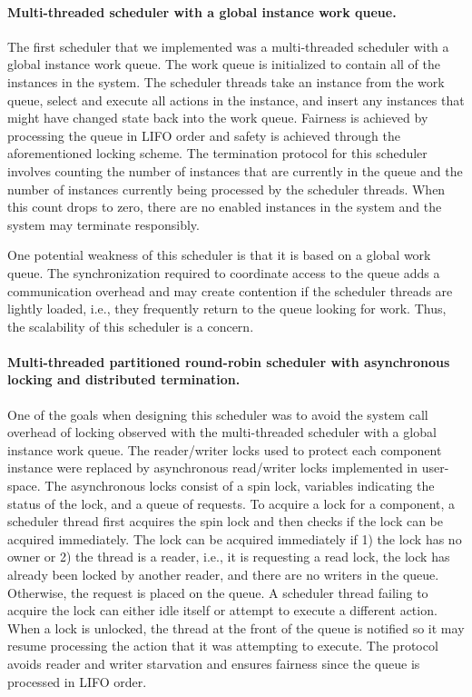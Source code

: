 \paragraph{Multi-threaded scheduler with a global instance work queue.}
The first scheduler that we implemented was a multi-threaded scheduler with a global instance work queue.
The work queue is initialized to contain all of the instances in the system.
The scheduler threads take an instance from the work queue, select and execute all actions in the instance, and insert any instances that might have changed state back into the work queue.
Fairness is achieved by processing the queue in LIFO order and safety is achieved through the aforementioned locking scheme.
The termination protocol for this scheduler involves counting the number of instances that are currently in the queue and the number of instances currently being processed by the scheduler threads.
When this count drops to zero, there are no enabled instances in the system and the system may terminate responsibly.

One potential weakness of this scheduler is that it is based on a global work queue.
The synchronization required to coordinate access to the queue adds a communication overhead and may create contention if the scheduler threads are lightly loaded, i.e., they frequently return to the queue looking for work.
Thus, the scalability of this scheduler is a concern.

\paragraph{Multi-threaded partitioned round-robin scheduler with asynchronous locking and distributed termination.}
One of the goals when designing this scheduler was to avoid the system call overhead of locking observed with the multi-threaded scheduler with a global instance work queue.
The reader/writer locks used to protect each component instance were replaced by asynchronous read/writer locks implemented in user-space.
The asynchronous locks consist of a spin lock, variables indicating the status of the lock, and a queue of requests.
To acquire a lock for a component, a scheduler thread first acquires the spin lock and then checks if the lock can be acquired immediately.
The lock can be acquired immediately if 1) the lock has no owner or 2) the thread is a reader, i.e., it is requesting a read lock, the lock has already been locked by another reader, and there are no writers in the queue.
Otherwise, the request is placed on the queue.
A scheduler thread failing to acquire the lock can either idle itself or attempt to execute a different action.
When a lock is unlocked, the thread at the front of the queue is notified so it may resume processing the action that it was attempting to execute.
The protocol avoids reader and writer starvation and ensures fairness since the queue is processed in LIFO order.

